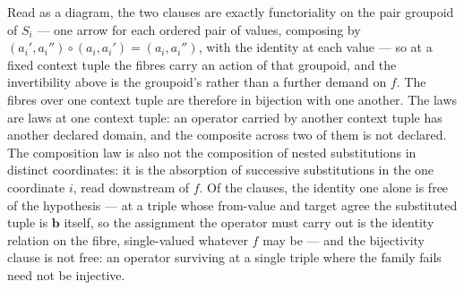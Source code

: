 \documentclass{article}
\theoremstyle{definition}
\theoremstyle{remark}
\begin{document}
\noindent Read as a diagram, the two clauses are exactly functoriality on the pair groupoid of $S_i$ --- one arrow for each ordered pair of values, composing by $(a_i', a_i'') \circ (a_i, a_i') = (a_i, a_i'')$, with the identity at each value --- so at a fixed context tuple the fibres carry an action of that groupoid, and the invertibility above is the groupoid's rather than a further demand on $f$. The fibres over one context tuple are therefore in bijection with one another. The laws are laws at one context tuple: an operator carried by another context tuple has another declared domain, and the composite across two of them is not declared. The composition law is also not the composition of nested substitutions in distinct coordinates: it is the absorption of successive substitutions in the one coordinate $i$, read downstream of $f$. Of the clauses, the identity one alone is free of the hypothesis --- at a triple whose from-value and target agree the substituted tuple is $\boldsymbol{b}$ itself, so the assignment the operator must carry out is the identity relation on the fibre, single-valued whatever $f$ may be --- and the bijectivity clause is not free: an operator surviving at a single triple where the family fails need not be injective.
\end{document}
